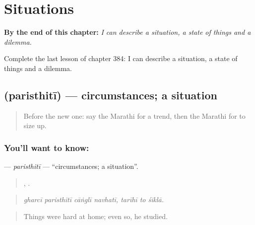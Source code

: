 
\chapter{Situations}
\label{ch:mr-situations}

\begin{chapteropening}
\textbf{By the end of this chapter:} \emph{I can describe a situation, a state of things and a dilemma.}

Complete the last lesson of chapter 384: I can describe a situation, a state of things and a dilemma.
\end{chapteropening}

\section[\texorpdfstring{\mr{परिस्थिती} (paristhitī)}{परिस्थिती (paristhitī)}]{ (paristhitī) — circumstances; a situation}

\label{lesson:MR-C384-paristhiti}



\begin{quote}
Before the new one: say the Marathi for a trend, then the Marathi for to size up.
\end{quote}

\subsection*{You'll want to know: }
\textbf{} — \emph{paristhitī} — \textquotedblleft{}circumstances; a situation\textquotedblright{}.

\begin{quote}
   ,   .
\end{quote}

\begin{quote}
\emph{gharcī paristhitī cāṅglī navhatī, tarīhī to śiklā.}
\end{quote}

\begin{quote}
Things were hard at home; even so, he studied.
\end{quote}

